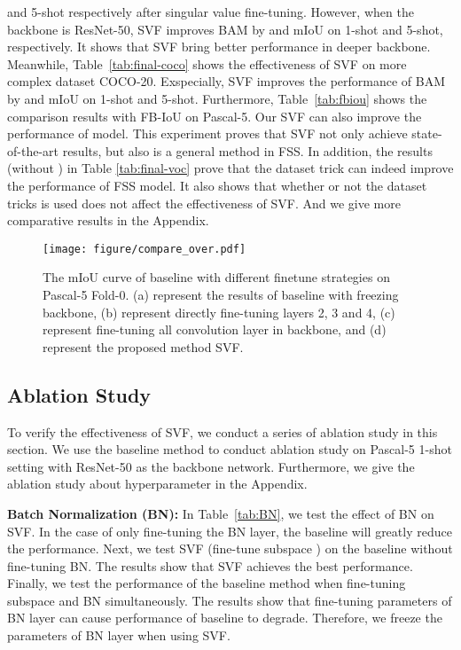 \documentclass{article}
\begin{document}
and 5-shot respectively after singular value fine-tuning. However, when the backbone is ResNet-50, SVF improves BAM by  and  mIoU on 1-shot and 5-shot, respectively. It shows that SVF bring better performance in deeper backbone.  Meanwhile, Table~\ref{tab:final-coco} shows the effectiveness of SVF on more complex dataset COCO-20. Exspecially, SVF improves the performance of BAM by  and  mIoU on 1-shot and 5-shot. Furthermore, Table~\ref{tab:fbiou} shows the comparison results with FB-IoU on Pascal-5. Our SVF can also improve the performance of model. This experiment proves that SVF not only achieve state-of-the-art results, but also is a general method in FSS. In addition, the results (without ) in Table \ref{tab:final-voc} prove that the dataset trick can indeed improve the performance of FSS model. It also shows that whether or not the dataset tricks is used does not affect the effectiveness of SVF. And we give more comparative results in the Appendix.


\begin{figure*}
    \setlength{\abovecaptionskip}{-.6em}
	\centering
	\texttt{[image: figure/compare\_over.pdf]}
	\caption{The mIoU curve of baseline with different finetune strategies on Pascal-5 Fold-0. (a) represent the results of baseline with freezing backbone, (b) represent directly fine-tuning layers 2, 3 and 4, (c) represent fine-tuning all  convolution layer in backbone, and (d) represent the proposed method SVF.}
	\label{fig:overfitting_comparison}
	\vspace{-0.6em}
\end{figure*}


\vspace{-.4em}
\subsection{Ablation Study}
\vspace{-.4em}
To verify the effectiveness of SVF, we conduct a series of ablation study in this section. We use the baseline method to conduct ablation study on Pascal-5 1-shot setting with ResNet-50 as the backbone network. Furthermore, we give the ablation study about hyperparameter in the Appendix.
 
\textbf{Batch Normalization (BN):} In Table~\ref{tab:BN}, we test the effect of BN on SVF. In the case of only fine-tuning the BN layer, the baseline will greatly reduce the performance. Next, we test SVF (fine-tune subspace ) on the baseline without fine-tuning BN. The results show that SVF achieves the best performance. Finally, we test the performance of the baseline method when fine-tuning subspace  and BN simultaneously. The results show that fine-tuning parameters of BN layer can cause performance of baseline to degrade. Therefore, we freeze the parameters of BN layer when using SVF.
\end{document}
